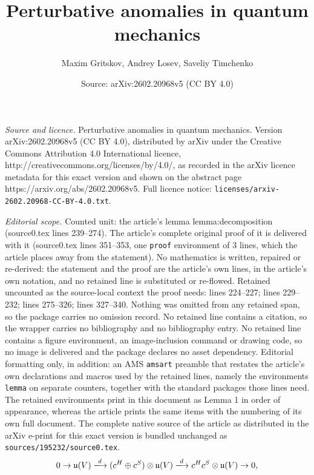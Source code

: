 \documentclass[10pt,a4paper]{amsart}
\title{Perturbative anomalies in quantum mechanics}
\author{Maxim Gritskov, Andrey Losev, Saveliy Timchenko}
\date{Source: arXiv:2602.20968v5 (CC BY 4.0)}
\begin{document}
\maketitle

\noindent\emph{Source and licence.} Perturbative anomalies in quantum mechanics. Version arXiv:2602.20968v5 (CC BY 4.0), distributed by arXiv under the Creative Commons Attribution 4.0 International licence, http://creativecommons.org/licenses/by/4.0/, as recorded in the arXiv licence metadata for this exact version and shown on the abstract page https://arxiv.org/abs/2602.20968v5. Full licence notice: \texttt{licenses/arxiv-2602.20968-CC-BY-4.0.txt}.\par\smallskip

\noindent\textit{Editorial scope.} Counted unit: the article's lemma lemma:decomposition (source0.tex lines 239--274). The article's complete original proof of it is delivered with it (source0.tex lines 351--353, one \texttt{proof} environment of 3 lines, which the article places away from the statement). No mathematics is written, repaired or re-derived: the statement and the proof are the article's own lines, in the article's own notation, and no retained line is substituted or re-flowed.  Retained uncounted as the source-local context the proof needs: lines 224--227; lines 229--232; lines 275--326; lines 327--340.  Nothing was omitted from any retained span, so the package carries no omission record.  No retained line contains a citation, so the wrapper carries no bibliography and no bibliography entry.  No retained line contains a figure environment, an image-inclusion command or drawing code, so no image is delivered and the package declares no asset dependency.  Editorial formatting only, in addition: an AMS \texttt{amsart} preamble that restates the article's own declarations and macros used by the retained lines, namely the environments \texttt{lemma} on separate counters, together with the standard packages those lines need.  The retained environments print in this document as Lemma 1 in order of appearance, whereas the article prints the same items with the numbering of its own full document.  The complete native source of the article as distributed in the arXiv e-print for this exact version is bundled unchanged as \texttt{sources/195232/source0.tex}.
\begin{equation}
\label{CE}
    0\rightarrow \mathfrak{u}(V)\xlongrightarrow{d}(c^H\oplus c^S)\otimes \mathfrak{u}(V) \xlongrightarrow{d} c^H c^S\otimes \mathfrak{u}(V)\rightarrow 0,
\end{equation}
\end{document}
